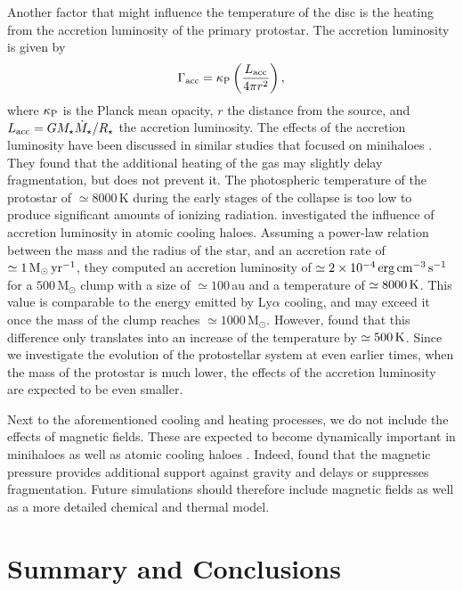 \documentclass[useAMS,usenatbib]{mnras}
\newcommand{\msun}{\text{M}_\odot}
\newcommand{\mstardot}{\dot{M}_\star}
\newcommand{\mstar}{M_\star}
\newcommand{\rstar}{R_\star}
\begin{document}
Another factor that might influence the temperature of the disc is the heating from the accretion luminosity of the primary protostar. The accretion luminosity is given by
\begin{equation}
\Gamma_{\rm acc}=\kappa_{\rm P} \left( {L_{\rm acc} \over 4\pi r^2} \right),
\end{equation}
where $\kappa_{\rm P}$ is the Planck mean opacity, $r$ the distance from the source, and $L_{\rm acc} = G\mstar \mstardot / \rstar$ the accretion luminosity. The effects of the accretion luminosity have been discussed in similar studies that focused on minihaloes \citep{Greif_2011, Smith_2011}. They found that the additional heating of the gas may slightly delay fragmentation, but does not prevent it. The photospheric temperature of the protostar of $\simeq 8000\,$K during the early stages of the collapse is too low to produce significant amounts of ionizing radiation. \citet{Latif_2013a} investigated the influence of accretion luminosity in atomic cooling haloes. Assuming a power-law relation between the mass and the radius of the star, and an accretion rate of $\simeq 1\,\msun\,{\rm yr}^{-1}$, they computed an accretion luminosity of $\simeq 2\times 10^{-4}\,{\rm erg}\,{\rm cm}^{-3}\,{\rm s}^{-1}$ for a $500\,\msun$ clump with a size of $\simeq 100\,$au and a temperature of $\simeq 8000\,{\rm K}$. This value is comparable to the energy emitted by Ly$\alpha$ cooling, and may exceed it once the mass of the clump reaches $\simeq 1000\,\msun$. However, \citet{Latif_2013a} found that this difference only translates into an increase of the temperature by $\simeq 500\,{\rm K}$. Since we investigate the evolution of the protostellar system at even earlier times, when the mass of the protostar is much lower, the effects of the accretion luminosity are expected to be even smaller.

Next to the aforementioned cooling and heating processes, we do not include the effects of magnetic fields. These are expected to become dynamically important in minihaloes as well as atomic cooling haloes \citep[e.g.][]{Xu_2008, Schleicher_2010, Sur_2010, Peters_2012, Peters_2014, Schober_2012, Turk_2012, Latif_2013c}. Indeed, \citet{Latif_2014b} found that the magnetic pressure provides additional support against gravity and delays or suppresses fragmentation. Future simulations should therefore include magnetic fields as well as a more detailed chemical and thermal model.

\section{Summary and Conclusions}
\label{sec:conclusion}
\end{document}
